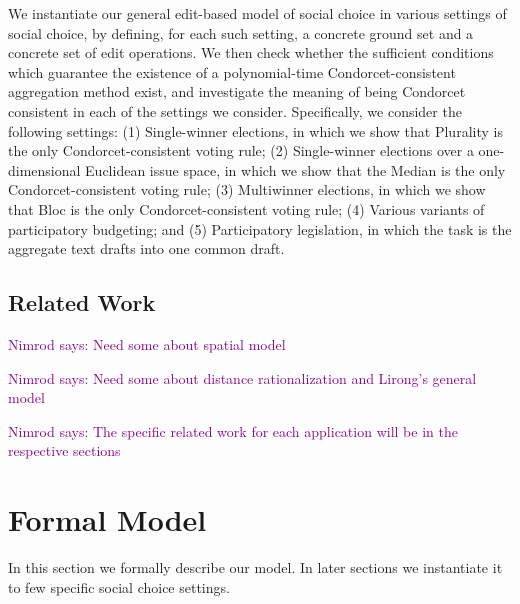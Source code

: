 \documentclass[sigconf]{aamas}  %
\newcommand{\nimrod}[1]{\textcolor{purple}{Nimrod says: #1}}
\begin{document}
We instantiate our general edit-based model of social choice in various settings of social choice,
by defining, for each such setting, a concrete ground set and a concrete set of edit operations.
We then check whether the sufficient conditions which guarantee the existence of a polynomial-time Condorcet-consistent aggregation method exist,
and investigate the meaning of being Condorcet consistent in each of the settings we consider.
Specifically, we consider the following settings:
  (1) Single-winner elections, in which we show that Plurality is the only Condorcet-consistent voting rule;
  (2) Single-winner elections over a one-dimensional Euclidean issue space, in which we show that the Median is the only Condorcet-consistent voting rule;
  (3) Multiwinner elections, in which we show that Bloc is the only Condorcet-consistent voting rule;
  (4) Various variants of participatory budgeting;
  and (5) Participatory legislation, in which the task is the aggregate text drafts into one common draft.


\subsection{Related Work}

\nimrod{Need some about spatial model}

\nimrod{Need some about distance rationalization and Lirong's general model}

\nimrod{The specific related work for each application will be in the respective sections}


\section{Formal Model}

In this section we formally describe our model. In later sections we instantiate it to few specific social choice settings.
\end{document}
